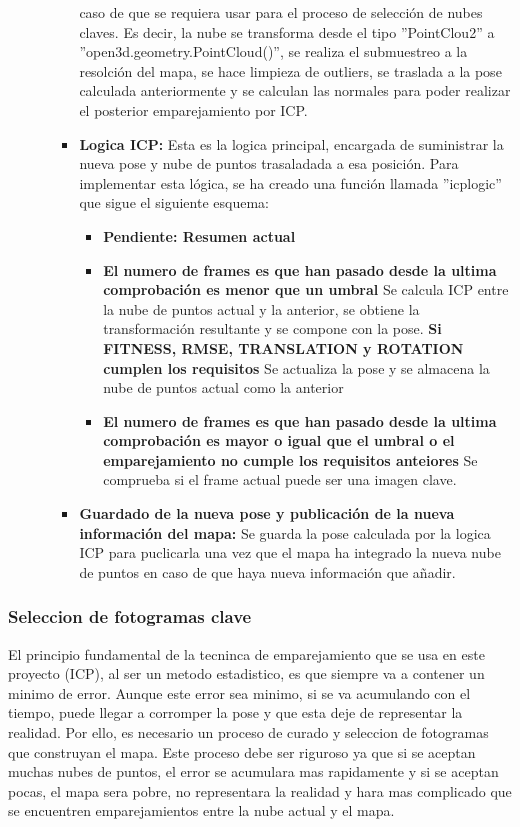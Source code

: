 \documentclass[12pt, a4paper, twoside]{article}
\begin{document}
\begin{itemize}
\begin{itemize}
\begin{itemize}
      caso de que se requiera usar para el proceso de selección de nubes claves. Es decir, la nube se transforma desde el tipo ''PointClou2'' a 
      ''open3d.geometry.PointCloud()'', se realiza el submuestreo a la resolción del mapa, se hace limpieza de outliers, se traslada a la pose calculada anteriormente y 
      se calculan las normales para poder realizar el posterior emparejamiento por ICP.
      \item \textbf{Logica ICP:} Esta es la logica principal, encargada de suministrar la nueva pose y nube de puntos trasaladada a esa posición. Para implementar esta 
      lógica, se ha creado una función llamada ''icp\textunderscore logic'' que sigue el siguiente esquema:
      \begin{itemize}
        \item \textbf{Pendiente: Resumen actual} 
        \item \textbf{El numero de frames es que han pasado desde la ultima comprobación es menor que un umbral} Se calcula ICP entre la nube de puntos actual y la anterior, 
        se obtiene la transformación resultante y se compone con la pose.
        \textbf{Si FITNESS, RMSE, TRANSLATION y ROTATION cumplen los requisitos} Se actualiza la pose y se almacena la nube de puntos actual como la anterior
        \item \textbf{El numero de frames es que han pasado desde la ultima comprobación es mayor o igual que el umbral o el emparejamiento no cumple los requisitos anteiores}
        Se comprueba si el frame actual puede ser una imagen clave.
      \end{itemize}
      \item \textbf{Guardado de la nueva pose y publicación de la nueva información del mapa:} Se guarda la pose calculada por la logica ICP para puclicarla una vez que el 
      mapa ha integrado la nueva nube de puntos en caso de que haya nueva información que añadir.
    \end{itemize}
  \end{itemize}
\end{itemize}

\subsubsection{Seleccion de fotogramas clave}
El principio fundamental de la tecninca de emparejamiento que se usa en este proyecto (ICP), al ser un metodo estadistico, es que siempre va a contener un minimo de error.
Aunque este error sea minimo, si se va acumulando con el tiempo, puede llegar a corromper la pose y que esta deje de representar la realidad. Por ello, es necesario un proceso
de curado y seleccion de fotogramas que construyan el mapa. Este proceso debe ser riguroso ya que si se aceptan muchas nubes de puntos, el error se acumulara mas rapidamente y 
si se aceptan pocas, el mapa sera pobre, no representara la realidad y hara mas complicado que se encuentren emparejamientos entre la nube actual y el mapa. \newline
\end{document}
